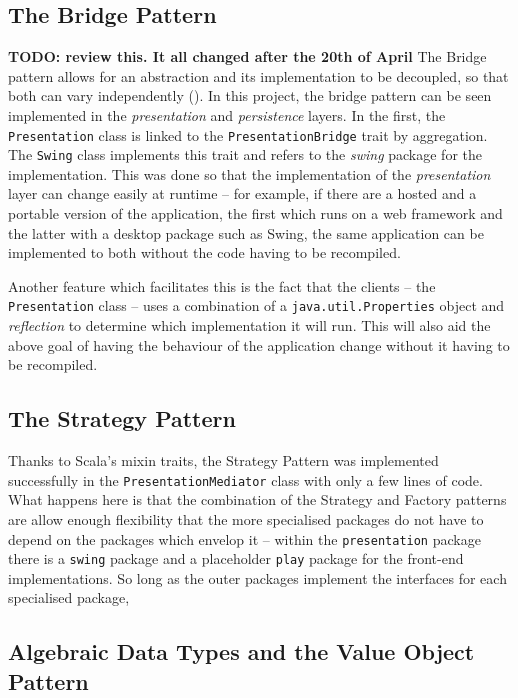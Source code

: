 \subsection{The Bridge Pattern} \label{sec:Implementation.TheBridgePattern}
\textbf{TODO: review this. It all changed after the 20th of April}
The Bridge pattern allows for an abstraction and its implementation to be
decoupled, so that both can vary independently
(\cite[][Ch.~7,Location~2699]{nikolov2016scala}). In this project, the bridge
pattern can be seen implemented in the \emph{presentation} and
\emph{persistence} layers. In the first, the \texttt{Presentation} class is
linked to the \texttt{PresentationBridge} trait by aggregation. The
\texttt{Swing} class implements this trait and refers to the \emph{swing}
package for the implementation. This was done so that the implementation of the
\emph{presentation} layer can change easily at runtime -- for example, if there
are a hosted and a portable version of the application, the first which runs on
a web framework and the latter with a desktop package such as Swing, the same
application can be implemented to both without the code having to be
recompiled.

Another feature which facilitates this is the fact that the clients -- the
\texttt{Presentation} class -- uses a combination of a
\texttt{java.util.Properties} object and \emph{reflection} to determine which
implementation it will run. This will also aid the above goal of having the
behaviour of the application change without it having to be recompiled.


\subsection{The Strategy Pattern} \label{sec:Implementation.TheStrategyPattern}

Thanks to Scala's mixin traits, the Strategy Pattern was implemented
successfully in the \texttt{PresentationMediator} class with only a few lines
of code. What happens here is that the combination of the Strategy and Factory
patterns are allow enough flexibility that the more specialised packages do not
have to depend on the packages which envelop it -- within the
\texttt{presentation} package there is a \texttt{swing} package and a
placeholder \texttt{play} package for the front-end implementations. So long as
the outer packages implement the interfaces for each specialised package, 

\subsection{Algebraic Data Types and the Value Object Pattern} \label{sec:Implementation.ADTAndValueObject}

